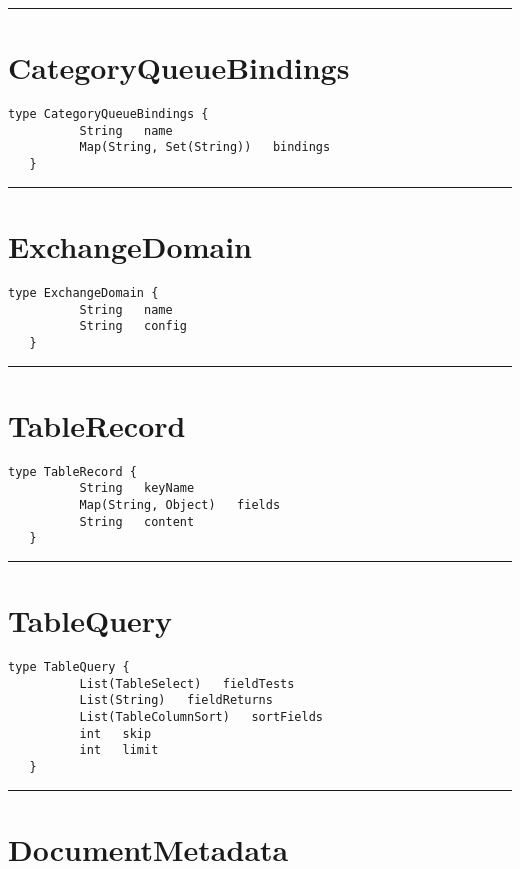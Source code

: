 \rule{12cm}{2pt}
\section{CategoryQueueBindings}
\label{type:CategoryQueueBindings}

\begin{lstlisting}[style=nonumbers]
   type CategoryQueueBindings {
          String   name
          Map(String, Set(String))   bindings
   }
\end{lstlisting}

\rule{12cm}{2pt}
\section{ExchangeDomain}
\label{type:ExchangeDomain}

\begin{lstlisting}[style=nonumbers]
   type ExchangeDomain {
          String   name
          String   config
   }
\end{lstlisting}

\rule{12cm}{2pt}
\section{TableRecord}
\label{type:TableRecord}

\begin{lstlisting}[style=nonumbers]
   type TableRecord {
          String   keyName
          Map(String, Object)   fields
          String   content
   }
\end{lstlisting}

\rule{12cm}{2pt}
\section{TableQuery}
\label{type:TableQuery}

\begin{lstlisting}[style=nonumbers]
   type TableQuery {
          List(TableSelect)   fieldTests
          List(String)   fieldReturns
          List(TableColumnSort)   sortFields
          int   skip
          int   limit
   }
\end{lstlisting}

\rule{12cm}{2pt}
\section{DocumentMetadata}
\label{type:DocumentMetadata}

